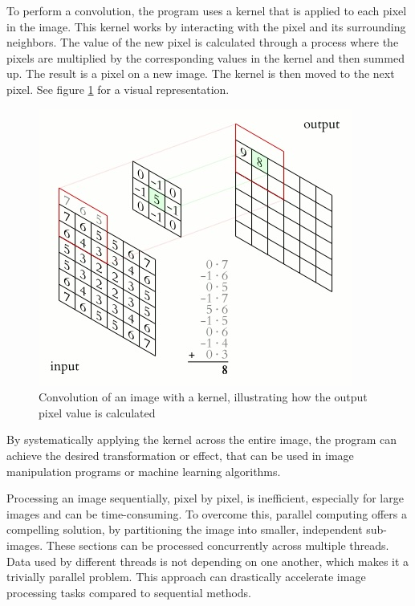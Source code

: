\documentclass{article}
\begin{document}
\begin{multicols}{2}
    To perform a convolution, the program uses a kernel that is applied to each pixel in the image. This kernel works by interacting with the pixel and its surrounding neighbors. The value of the new pixel is calculated through a process where the pixels are multiplied by the corresponding values in the kernel and then summed up. The result is a pixel on a new image. The kernel is then moved to the next pixel. See figure \ref{fig:kernel} for a visual representation.

    \begin{figure}[H]
        \centering
        \includegraphics[width=\linewidth]{img/kernel.jpg}
        \caption{Convolution of an image with a kernel, illustrating how the output pixel value is calculated}
        \label{fig:kernel}
    \end{figure}

    By systematically applying the kernel across the entire image, the program can achieve the desired transformation or effect, that can be used in image manipulation programs or machine learning algorithms.

    Processing an image sequentially, pixel by pixel, is inefficient, especially for large images and can be time-consuming. To overcome this, parallel computing offers a compelling solution, by partitioning the image into smaller, independent sub-images. These sections can be processed concurrently across multiple threads. Data used by different threads is not depending on one another, which makes it a trivially parallel problem. This approach can drastically accelerate image processing tasks compared to sequential methods.


\end{multicols}
\end{document}
